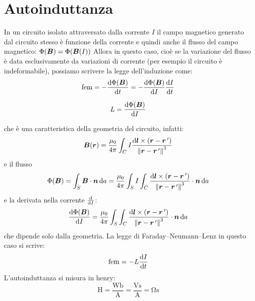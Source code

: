 \section{Autoinduttanza}
In un circuito isolato attraversato dalla corrente $I$ il campo magnetico generato dal circuito stesso è funzione della corrente e quindi anche il flusso del campo magnetico: $\Phi(\boldsymbol{B})=\Phi(\boldsymbol{B}(I))$
Allora in questo caso, cioè se la variazione del flusso è data esclusivamente da variazioni di corrente (per esempio il circuito è indeformabile), possiamo scrivere la legge dell'induzione come:
\begin{equation}
  \text{fem}=-\frac{\mathrm{d}\Phi(\boldsymbol{B})}{\mathrm{d} t}=-\frac{\mathrm{d}\Phi(\boldsymbol{B})}{\mathrm{d} I}\frac{\mathrm{d} I}{\mathrm{d} t}
\end{equation}
\begin{Def}
  \begin{equation}
    L=\frac{\mathrm{d}\Phi(\boldsymbol{B})}{\mathrm{d} I}
  \end{equation}
\end{Def}
che è una caratteristica della geometria del circuito, infatti:
\[
  \boldsymbol{B}(\boldsymbol{r})=\frac{\mu_0}{4\pi}\int_C I\frac{\mathrm{d} \boldsymbol{l}\times\left(\boldsymbol{r}-\boldsymbol{r}\,'\right)}{\left\lVert\boldsymbol{r}-\boldsymbol{r}\,'\right\rVert^3}
\]
e il flusso
\[
  \Phi(\boldsymbol{B})=\int_S \boldsymbol{B}\cdot\boldsymbol{n}\,\mathrm{d} a = \frac{\mu_0}{4\pi}\int_S I\int_C\frac{\mathrm{d} \boldsymbol{l}\times\left(\boldsymbol{r}-\boldsymbol{r}\,'\right)}{\left\lVert\boldsymbol{r}-\boldsymbol{r}\,'\right\rVert^3}\cdot \boldsymbol{n}\,\mathrm{d} a
\]
e la derivata nella corrente $\frac{\mathrm{d}}{\mathrm{d} I}$:
\[
  \frac{\mathrm{d}\Phi(\boldsymbol{B})}{\mathrm{d} I}=\frac{\mu_0}{4\pi}\int_S\int_C\frac{\mathrm{d} \boldsymbol{l}\times\left(\boldsymbol{r}-\boldsymbol{r}\,'\right)}{\left\lVert\boldsymbol{r}-\boldsymbol{r}\,'\right\rVert^3}\cdot \boldsymbol{n}\,\mathrm{d} a
\]
che dipende solo dalla geometria. La legge di Faraday--Neumann--Lenz in questo caso si scrive:
\begin{equation}
  \text{fem}=-L\frac{\mathrm{d} I}{\mathrm{d} t}
\end{equation}
L'autoinduttanza si misura in henry:
\[
  \si{\henry}=\frac{\si{\weber}}{\si{\ampere}}=\frac{\si{\volt\second}}{\si{\ampere}}=\si{\ohm\second}
\]
